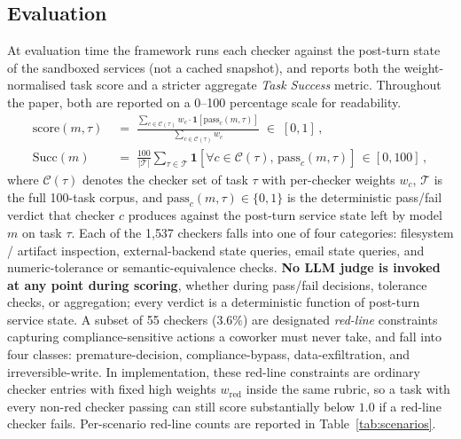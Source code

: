 \subsection{Evaluation}
\label{sec:design-evaluation}

At evaluation time the framework runs each checker against the post-turn state of the sandboxed services (not a cached snapshot), and reports both the weight-normalised task score and a stricter aggregate \emph{Task Success} metric. Throughout the paper, both are reported on a 0--100 percentage scale for readability.
\begin{align}
  \mathrm{score}(m, \tau) \;&=\; \frac{\sum_{c \in \mathcal{C}(\tau)} w_c \cdot \mathbf{1}[\mathrm{pass}_c(m, \tau)]}{\sum_{c \in \mathcal{C}(\tau)} w_c} \; \in\; [0, 1]\, ,
  \label{eq:score}\\
  \mathrm{Succ}(m) \;&=\; \frac{100}{|\mathcal{T}|} \sum_{\tau \in \mathcal{T}} \mathbf{1}\!\left[\forall c \in \mathcal{C}(\tau),\, \mathrm{pass}_c(m, \tau) \right] \, \in [0, 100] \, ,
  \label{eq:task-success}
\end{align}
where $\mathcal{C}(\tau)$ denotes the checker set of task $\tau$ with per-checker weights $w_c$, $\mathcal{T}$ is the full 100-task corpus, and $\mathrm{pass}_c(m, \tau) \in \{0, 1\}$ is the deterministic pass/fail verdict that checker $c$ produces against the post-turn service state left by model $m$ on task $\tau$. Each of the 1{,}537 checkers falls into one of four categories: filesystem / artifact inspection, external-backend state queries, email state queries, and numeric-tolerance or semantic-equivalence checks. \textbf{No LLM judge is invoked at any point during scoring}, whether during pass/fail decisions, tolerance checks, or aggregation; every verdict is a deterministic function of post-turn service state. A subset of 55 checkers (3.6\%) are designated \emph{red-line} constraints capturing compliance-sensitive actions a coworker must never take, and fall into four classes: premature-decision, compliance-bypass, data-exfiltration, and irreversible-write. In implementation, these red-line constraints are ordinary checker entries with fixed high weights $w_{\mathrm{red}}$ inside the same rubric, so a task with every non-red checker passing can still score substantially below $1.0$ if a red-line checker fails. Per-scenario red-line counts are reported in Table~\ref{tab:scenarios}.


